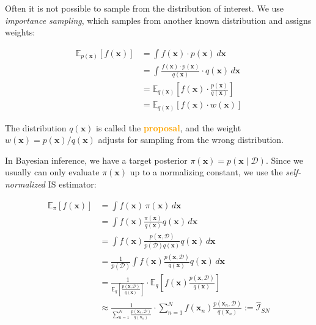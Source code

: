 \documentclass[11pt,a4paper]{article}
\begin{document}
Often it is not possible to sample from the distribution of interest. We use \textit{importance sampling}, which samples from another known distribution and assigns weights:

\begin{align}
\mathbb{E}_{p(\mathbf{x})}[f(\mathbf{x})] &= \int f(\mathbf{x}) \cdot p(\mathbf{x}) \, d\mathbf{x} \nonumber \\
&= \int \frac{f(\mathbf{x}) \cdot p(\mathbf{x})}{q(\mathbf{x})} \cdot q(\mathbf{x}) \, d\mathbf{x} \nonumber \\
&= \mathbb{E}_{q(\mathbf{x})} \left[ f(\mathbf{x}) \cdot \frac{p(\mathbf{x})}{q(\mathbf{x})} \right] \nonumber \\
&= \mathbb{E}_{q(\mathbf{x})} \left[ f(\mathbf{x}) \cdot w(\mathbf{x}) \right]
\label{eq:importance_sampling}
\end{align}

The distribution $q(\mathbf{x})$ is called the \textcolor{orange}{\textbf{proposal}}, and the weight $w(\mathbf{x}) = p(\mathbf{x})/q(\mathbf{x})$ adjusts for sampling from the wrong distribution.

In Bayesian inference, we have a target posterior $\pi(\mathbf{x}) = p(\mathbf{x} \mid \mathcal{D})$. Since we usually can only evaluate $\pi(\mathbf{x})$ up to a normalizing constant, we use the \textit{self-normalized} IS estimator:

\begin{align}
\mathbb{E}_{\pi}[f(\mathbf{x})] &= \int f(\mathbf{x}) \, \pi(\mathbf{x}) \, d\mathbf{x} \nonumber \\
&= \int f(\mathbf{x}) \frac{\pi(\mathbf{x})}{q(\mathbf{x})} q(\mathbf{x}) \, d\mathbf{x} \nonumber \\
&= \int f(\mathbf{x}) \frac{p(\mathbf{x}, \mathcal{D})}{p(\mathcal{D})q(\mathbf{x})} q(\mathbf{x}) \, d\mathbf{x} \nonumber \\
&= \frac{1}{p(\mathcal{D})} \int f(\mathbf{x}) \frac{p(\mathbf{x}, \mathcal{D})}{q(\mathbf{x})} q(\mathbf{x}) \, d\mathbf{x} \nonumber \\
&= \frac{1}{\mathbb{E}_q\left[\frac{p(\mathbf{x}, \mathcal{D})}{q(\mathbf{x})}\right]} \cdot \mathbb{E}_q\left[f(\mathbf{x}) \frac{p(\mathbf{x}, \mathcal{D})}{q(\mathbf{x})}\right] \nonumber \\
&\approx \frac{1}{\sum_{n=1}^{N} \frac{p(\mathbf{x}_n, \mathcal{D})}{q(\mathbf{x}_n)}} \cdot \sum_{n=1}^{N} f(\mathbf{x}_n) \frac{p(\mathbf{x}_n, \mathcal{D})}{q(\mathbf{x}_n)} := \widehat{\mathcal{I}}_{SN}
\label{eq:self_normalized_is}
\end{align}
\end{document}
